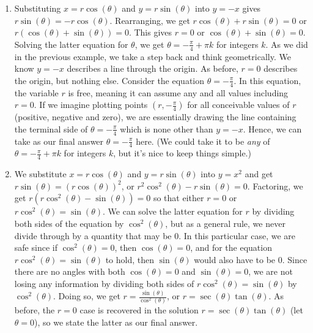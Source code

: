 {\begin{enumerate}
\item  Substituting $x = r\cos(\theta)$ and $y = r\sin(\theta)$ into $y=-x$ gives $r\sin(\theta)= -r\cos(\theta)$. Rearranging, we get  $r\cos(\theta) + r\sin(\theta) = 0$ or $r(\cos(\theta) + \sin(\theta)) = 0$.  This gives $r=0$ or $\cos(\theta) + \sin(\theta) = 0$.  Solving the latter equation for $\theta$, we get $\theta = -\frac{\pi}{4} + \pi k$ for integers $k$. As we did in the previous example, we take a step back and think geometrically. We know $y=-x$ describes a line through the origin.  As before, $r=0$ describes the origin, but nothing else.  Consider the equation $\theta = -\frac{\pi}{4}$.  In this equation, the variable $r$ is free, meaning it can assume any and all values including $r=0$. If we imagine plotting points $(r, -\frac{\pi}{4})$  for all conceivable values of $r$ (positive, negative and zero), we are essentially drawing the line containing the terminal side of $\theta = -\frac{\pi}{4}$ which is none other than $y = -x$.  Hence, we can take as our final answer   $\theta = -\frac{\pi}{4}$ here. (We could take it to be \textit{any} of $\theta = -\frac{\pi}{4} + \pi k$ for integers $k$, but it's nice to keep things simple.) 

\item  We substitute $x = r\cos(\theta)$ and $y = r\sin(\theta)$ into $y = x^2$ and get $r\sin(\theta) = (r\cos(\theta))^2$, or $r^2\cos^2(\theta) - r\sin(\theta) = 0$.  Factoring, we get $r(r\cos^2(\theta) - \sin(\theta)) = 0$ so that either $r=0$ or $r\cos^2(\theta) = \sin(\theta)$. We can solve the latter equation for $r$ by dividing both sides of the equation by $\cos^{2}(\theta)$, but as a general rule, we never divide through by a quantity that may be $0$.  In this particular case, we are safe since if $\cos^{2}(\theta) = 0$, then $\cos(\theta) = 0$,  and for the equation $r\cos^2(\theta) = \sin(\theta)$  to hold, then $\sin(\theta)$ would also have to be $0$.  Since there are no angles with both $\cos(\theta) = 0$ and $\sin(\theta) = 0$, we are not losing any information by dividing both sides of $r\cos^2(\theta) = \sin(\theta)$ by $\cos^{2}(\theta)$.  Doing so, we get $r = \frac{\sin(\theta)}{\cos^2(\theta)}$, or $r = \sec(\theta) \tan(\theta)$.  As before, the $r=0$ case is recovered in the solution $r = \sec(\theta) \tan(\theta)$ (let $\theta =0$), so we state the latter as our final answer.

\end{enumerate}
}

\medskip

